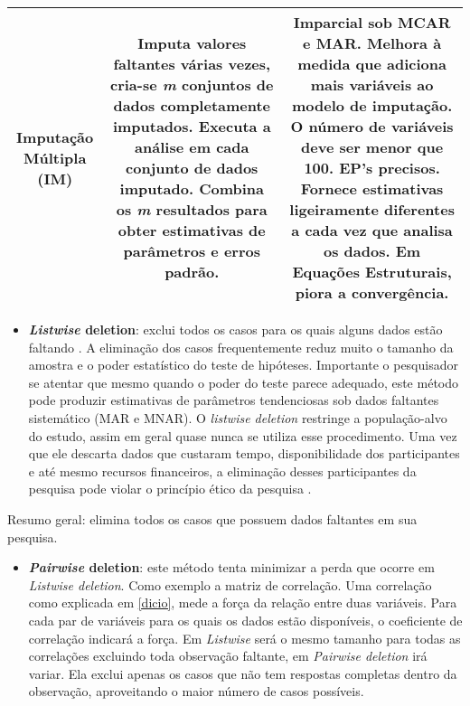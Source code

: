\documentclass[
]{book}
\providecommand{\tightlist}{%
  \setlength{\itemsep}{0pt}\setlength{\parskip}{0pt}}
\begin{document}
\begin{longtable}[]{@{}ccc@{}}
\begin{minipage}[t]{0.30\columnwidth}
\textbf{Imputação Múltipla (IM)}\strut
\end{minipage} & \begin{minipage}[t]{0.30\columnwidth}\centering
Imputa valores faltantes várias vezes, cria-se \emph{m} conjuntos de dados completamente imputados. Executa a análise em cada conjunto de dados imputado. Combina os \emph{m} resultados para obter estimativas de parâmetros e erros padrão.\strut
\end{minipage} & \begin{minipage}[t]{0.30\columnwidth}\centering
Imparcial sob MCAR e MAR. Melhora à medida que adiciona mais variáveis ao modelo de imputação. O número de variáveis deve ser menor que 100. EP's precisos. Fornece estimativas ligeiramente diferentes a cada vez que analisa os dados. Em Equações Estruturais, piora a convergência.\strut
\end{minipage}\tabularnewline
\bottomrule
\end{longtable}

\begin{itemize}
\tightlist
\item
  \textbf{\emph{Listwise} deletion}: exclui todos os casos para os quais alguns dados estão faltando . A eliminação dos casos frequentemente reduz muito o tamanho da amostra e o poder estatístico do teste de hipóteses. Importante o pesquisador se atentar que mesmo quando o poder do teste parece adequado, este método pode produzir estimativas de parâmetros tendenciosas sob dados faltantes sistemático (MAR e MNAR). O \emph{listwise deletion} restringe a população-alvo do estudo, assim em geral quase nunca se utiliza esse procedimento. Uma vez que ele descarta dados que custaram tempo, disponibilidade dos participantes e até mesmo recursos financeiros, a eliminação desses participantes da pesquisa pode violar o princípio ético da pesquisa \citep{rosenthal1994science}.
\end{itemize}

Resumo geral: elimina todos os casos que possuem dados faltantes em sua pesquisa.

\begin{itemize}
\tightlist
\item
  \textbf{\emph{Pairwise} deletion}: este método tenta minimizar a perda que ocorre em \emph{Listwise deletion}. Como exemplo a matriz de correlação. Uma correlação como explicada em \ref{dicio}, mede a força da relação entre duas variáveis. Para cada par de variáveis para os quais os dados estão disponíveis, o coeficiente de correlação indicará a força. Em \emph{Listwise} será o mesmo tamanho para todas as correlações excluindo toda observação faltante, em \emph{Pairwise deletion} irá variar. Ela exclui apenas os casos que não tem respostas completas dentro da observação, aproveitando o maior número de casos possíveis.
\end{itemize}
\end{document}
